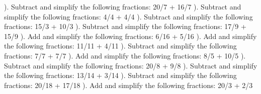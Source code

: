 \documentclass{article}%
\begin{document}
\newline%
). Subtract and simplify the following fractions: 20/7 + 16/7%
\newline%
\newline%
). Subtract and simplify the following fractions: 4/4 + 4/4%
\newline%
\newline%
). Subtract and simplify the following fractions: 15/3 + 10/3%
\newline%
\newline%
). Subtract and simplify the following fractions: 17/9 + 15/9%
\newline%
\newline%
). Add and simplify the following fractions: 6/16 + 5/16%
\newline%
\newline%
). Add and simplify the following fractions: 11/11 + 4/11%
\newline%
\newline%
). Subtract and simplify the following fractions: 7/7 + 7/7%
\newline%
\newline%
). Add and simplify the following fractions: 8/5 + 10/5%
\newline%
\newline%
). Subtract and simplify the following fractions: 20/8 + 9/8%
\newline%
\newline%
). Subtract and simplify the following fractions: 13/14 + 3/14%
\newline%
\newline%
). Subtract and simplify the following fractions: 20/18 + 17/18%
\newline%
\newline%
). Add and simplify the following fractions: 20/3 + 2/3%
\newline%
\newline%
\end{document}
